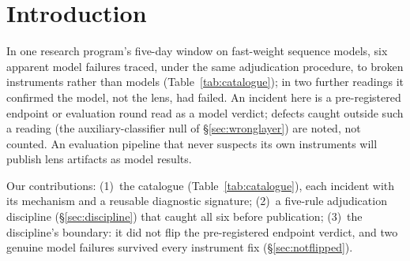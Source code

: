 \section{Introduction}
\label{sec:intro}

 In one research program's five-day window on fast-weight sequence
models, six apparent model failures traced, under the same
adjudication procedure, to broken instruments rather than models
(Table~\ref{tab:catalogue}); in two further readings it confirmed
the model, not the lens, had failed. An incident
here is a pre-registered endpoint or evaluation round read as a model
verdict; defects caught outside such a reading (the
auxiliary-classifier null of \S\ref{sec:wronglayer}) are noted, not
counted. An evaluation pipeline that never suspects its own
instruments will publish lens artifacts as model results.

Our contributions: (1)~the catalogue (Table~\ref{tab:catalogue}), each
incident with its mechanism
and a reusable diagnostic signature; (2)~a five-rule
adjudication discipline (\S\ref{sec:discipline}) that caught all six
before publication; (3)~the discipline's boundary: it did not flip the
pre-registered endpoint verdict, and two genuine model failures
survived every instrument fix (\S\ref{sec:notflipped}).

